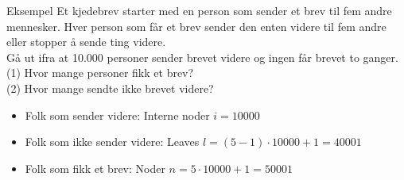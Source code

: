 \begin{frame}{Eksempel}
Et kjedebrev starter med en person som sender et brev til fem andre mennesker. Hver person som får et brev sender den enten videre til fem andre eller stopper å sende ting videre.\\
Gå ut ifra at 10.000 personer sender brevet videre og ingen får brevet to ganger.\\
(1) Hvor mange personer fikk et brev?\\
(2) Hvor mange sendte ikke brevet videre?\\\pause
\begin{itemize}
\item Folk som sender videre: Interne noder $i=10000$
\item Folk som ikke sender videre: Leaves $l = (5-1)\cdot 10000 + 1 = 40001$
\item Folk som fikk et brev: Noder $n=5\cdot 10000 + 1 = 50001$
\end{itemize}
\end{frame}
